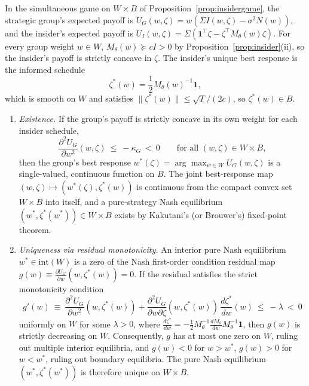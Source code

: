 In the simultaneous game on $W\times B$ of Proposition~\ref{prop:insidergame}, the strategic group's expected payoff is $U_G(w,\zeta)=w(\Sigma I(w,\zeta)-\sigma^2 N(w))$, and the insider's expected payoff is $U_I(w,\zeta)=\Sigma(\mathbf 1^\top\zeta-\zeta^\top M_\theta(w)\zeta)$. For every group weight $w\in W$, $M_\theta(w)\succeq c I>0$ by Proposition~\ref{prop:insider}(ii), so the insider's payoff is strictly concave in $\zeta$. The insider's unique best response is the informed schedule
\[
\zeta^*(w) = \frac12 M_\theta(w)^{-1}\mathbf 1,
\]
which is smooth on $W$ and satisfies $\|\zeta^*(w)\|\le\sqrt T/(2c)$, so $\zeta^*(w)\in B$.

\begin{proposition}\label{prop:nashqc}
\begin{enumerate}[label=(\roman*),itemsep=1pt]
\item \emph{Existence.} If the group's payoff is strictly concave in its own weight for each insider schedule,
\[
\frac{\partial^2 U_G}{\partial w^2}(w,\zeta)\ \le\ -\kappa_G\ <\ 0\qquad\text{for all }(w,\zeta)\in W\times B,
\]
then the group's best response $w^*(\zeta)=\arg\max_{w\in W}U_G(w,\zeta)$ is a single-valued, continuous function on $B$. The joint best-response map $(w,\zeta)\mapsto(w^*(\zeta),\zeta^*(w))$ is continuous from the compact convex set $W\times B$ into itself, and a pure-strategy Nash equilibrium $(w^*,\zeta^*(w^*))\in W\times B$ exists by Kakutani's (or Brouwer's) fixed-point theorem.
\item \emph{Uniqueness via residual monotonicity.} An interior pure Nash equilibrium $w^*\in\mathrm{int}(W)$ is a zero of the Nash first-order condition residual map $g(w)\equiv\frac{\partial U_G}{\partial w}(w,\zeta^*(w))=0$. If the residual satisfies the strict monotonicity condition
\[
g'(w)\ \equiv\ \frac{\partial^2 U_G}{\partial w^2}(w,\zeta^*(w)) + \frac{\partial^2 U_G}{\partial w\partial\zeta}(w,\zeta^*(w))\,\frac{d\zeta^*}{dw}(w)\ \le\ -\lambda\ <\ 0
\]
uniformly on $W$ for some $\lambda>0$, where $\frac{d\zeta^*}{dw}=-\frac12 M_\theta^{-1}\frac{dM_\theta}{dw}M_\theta^{-1}\mathbf 1$, then $g(w)$ is strictly decreasing on $W$. Consequently, $g$ has at most one zero on $W$, ruling out multiple interior equilibria, and $g(w)<0$ for $w>w^*$, $g(w)>0$ for $w<w^*$, ruling out boundary equilibria. The pure Nash equilibrium $(w^*,\zeta^*(w^*))$ is therefore unique on $W\times B$.
\end{enumerate}
\end{proposition}


